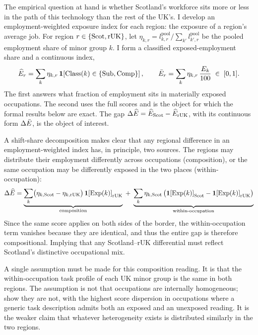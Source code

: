 The empirical question at hand is whether Scotland's workforce sits more or less in the path of this technology than the rest of the UK's. I develop an employment-weighted exposure index for each region: the exposure of a region's average job. For region $r \in \{\mathrm{Scot}, \mathrm{rUK}\}$, let $\eta_{k,r} = l^{\mathrm{pool}}_{k,r} \big/ \sum_{k'} l^{\mathrm{pool}}_{k',r}$ be the pooled employment share of minor group $k$. I form a classified exposed-employment share and a continuous index,
\begin{equation}\label{eq:indices}
\widehat{E}_r = \sum_k \eta_{k,r}\,
  \mathbf{1}\!\left[\mathrm{Class}(k) \in \{\mathrm{Sub}, \mathrm{Comp}\}\right],
\qquad
\bar{E}_r = \sum_k \eta_{k,r}\, \frac{E_k}{100}
  \;\in\; [0,1].
\end{equation}
The first answers what fraction of employment sits in materially exposed occupations. The second uses the full scores and is the object for which the formal results below are exact. The gap $\Delta\widehat{E} = \widehat{E}_{\mathrm{Scot}} - \widehat{E}_{\mathrm{rUK}}$, with its continuous form $\Delta\bar{E}$, is the object of interest.

A shift-share decomposition makes clear that any regional difference in an employment-weighted index has, in principle, two sources. The regions may distribute their employment differently across occupations (composition), or the same occupation may be differently exposed in the two places (within-occupation):
\begin{equation}\label{eq:shiftshare}
\Delta\widehat{E} =
\underbrace{\sum_k \bigl(\eta_{k,\mathrm{Scot}} - \eta_{k,\mathrm{rUK}}\bigr)\,
  \mathbf{1}\!\left[\mathrm{Exp}(k)\right]_{\mathrm{rUK}}}_{\text{composition}}
\;+\;
\underbrace{\sum_k \eta_{k,\mathrm{Scot}}\,
  \bigl(\mathbf{1}\!\left[\mathrm{Exp}(k)\right]_{\mathrm{Scot}} -
        \mathbf{1}\!\left[\mathrm{Exp}(k)\right]_{\mathrm{rUK}}\bigr)}_{\text{within-occupation}}
\end{equation}
Since the same score applies on both sides of the border, the within-occupation term vanishes because they are identical, and thus the entire gap is therefore compositional. Implying that any Scotland--rUK differential must reflect Scotland's distinctive occupational mix.

A single assumption must be made for this composition reading.
It is that the within-occupation task profile of each UK minor group is the same in both regions. The assumption is not that occupations are internally homogeneous; \citet{henseke2025} show they are not, with the highest score dispersion in occupations where a generic task description admits both an exposed and an unexposed reading. It is the weaker claim that whatever heterogeneity exists is distributed similarly in the two regions.

